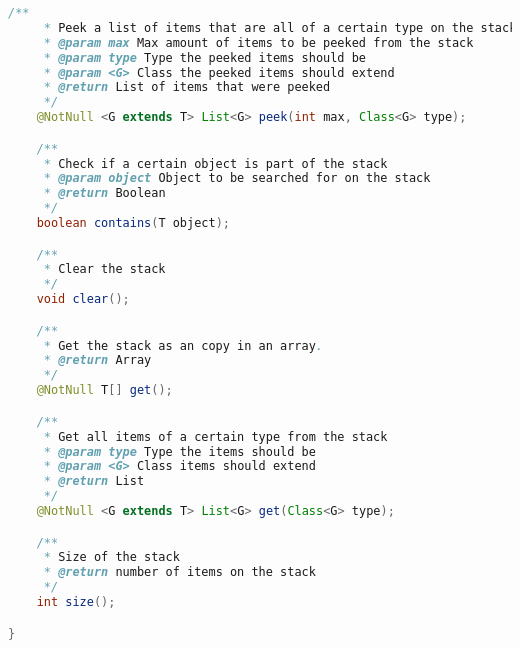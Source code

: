 \begin{lstlisting}[caption=StackInterface (Schwenke),label=list:StackInterface,language=Java]
    /**
     * Peek a list of items that are all of a certain type on the stack
     * @param max Max amount of items to be peeked from the stack
     * @param type Type the peeked items should be
     * @param <G> Class the peeked items should extend
     * @return List of items that were peeked
     */
    @NotNull <G extends T> List<G> peek(int max, Class<G> type);

    /**
     * Check if a certain object is part of the stack
     * @param object Object to be searched for on the stack
     * @return Boolean
     */
    boolean contains(T object);

    /**
     * Clear the stack
     */
    void clear();

    /**
     * Get the stack as an copy in an array.
     * @return Array
     */
    @NotNull T[] get();

    /**
     * Get all items of a certain type from the stack
     * @param type Type the items should be
     * @param <G> Class items should extend
     * @return List
     */
    @NotNull <G extends T> List<G> get(Class<G> type);

    /**
     * Size of the stack
     * @return number of items on the stack
     */
    int size();

}
\end{lstlisting}    

